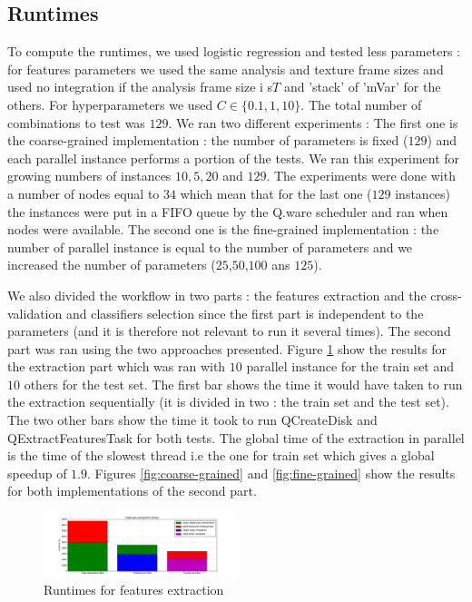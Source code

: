 \documentclass[10pt, conference, compsocconf]{IEEEtran}
\begin{document}
\subsection{Runtimes}
To compute the runtimes, we used logistic regression and tested less parameters : for features parameters we used the same analysis and texture frame sizes and used no integration if the analysis frame size i s$T$ and 'stack' of 'mVar' for the others. For hyperparameters we used $C \in \{ 0.1, 1, 10 \}$. The total number of combinations to test was $129$.  We ran two different experiments :
The first one is the coarse-grained implementation : the number of parameters is fixed ($129$) and each parallel instance performs a portion of the tests. We ran this experiment for growing numbers of instances $10, 5, 20$ and $129$. The experiments were done with a number of nodes equal to $34$ which mean that for the last one ($129$ instances) the instances were put in a FIFO queue by the Q.ware scheduler and ran when nodes were available. The second one is the fine-grained implementation : the number of parallel instance is equal to the number of parameters and we increased the number of parameters ($25$,$50$,$100$ ans $125$).  

We also divided the workflow in two parts : the features extraction and the cross-validation and classifiers selection since the first part is independent to the parameters (and it is therefore not relevant to run it several times). The second part was ran using the two approaches presented. Figure \ref{fig:times_extraction} show the results for the extraction part which was ran with $10$ parallel instance for the train set and $10$ others for the test set. The first bar shows the time it would have taken to run the extraction sequentially (it is divided in two : the train set and the test set). The two other bars show the time it took to run QCreateDisk and QExtractFeaturesTask for both tests. The global time of the extraction in parallel is the time of the slowest thread i.e the one for train set which gives a global speedup of $1.9$. Figures \ref{fig:coarse-grained} and \ref{fig:fine-grained} show the results for both implementations of the second part. 

\begin{figure}[h]
  \centering
  \includegraphics[width=0.5\textwidth]{Figures/times_extraction.png}
  \caption{Runtimes for features extraction \label{fig:times_extraction}}
\end{figure}
\end{document}

